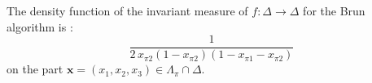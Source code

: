 The density function of the invariant measure of $f:\Delta\to\Delta$ for
the Brun algorithm is \cite{arnoux_symmetric_2015}:
\[
\frac{1}{2\,x_{\pi 2}(1-x_{\pi 2})(1-x_{\pi 1}-x_{\pi 2})}
\]
on the part $\mathbf{x}=(x_1,x_2,x_3)\in\Lambda_\pi\cap\Delta$.
